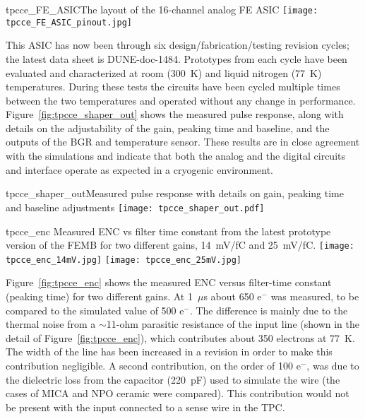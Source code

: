\begin{cdrfigure}{tpcce_FE_ASIC}{The layout of the 16-channel analog FE ASIC}
\texttt{[image: tpcce\_FE\_ASIC\_pinout.jpg]}
\end{cdrfigure}

This ASIC has now been through six design/fabrication/testing revision cycles; the latest data sheet is DUNE-doc-1484.
Prototypes from each cycle have been evaluated and characterized at room (300~K) and liquid nitrogen (77~K) temperatures.
During these tests the circuits have been cycled multiple times
between the two temperatures and operated without any change in performance.
Figure~\ref{fig:tpcce_shaper_out} shows the measured pulse response, along with
details on the adjustability of the gain, peaking time and baseline,
and the outputs of the BGR and temperature sensor.
These results are in close agreement with the simulations and indicate
that both the analog and the digital circuits and interface operate as
expected in a cryogenic environment.

\begin{cdrfigure}{tpcce_shaper_out}{Measured pulse response with details on gain, peaking time and baseline adjustments}
\texttt{[image: tpcce\_shaper\_out.pdf]}
\end{cdrfigure}

\begin{cdrfigure}{tpcce_enc}{
Measured ENC vs filter time constant from the latest prototype version of the FEMB
for two different gains, 14~mV/fC and 25~mV/fC.}
\texttt{[image: tpcce\_enc\_14mV.jpg]}
\texttt{[image: tpcce\_enc\_25mV.jpg]}
\end{cdrfigure}


Figure~\ref{fig:tpcce_enc} shows the measured ENC versus filter-time constant (peaking time) for two different gains.
At 1~$\mu$s about 650 e$^{-}$ was measured, to be compared to the simulated value of 500 e$^{-}$.
The difference is mainly due to the thermal noise from a $\sim$11-ohm parasitic resistance of the input
line (shown in the detail of Figure~\ref{fig:tpcce_enc}), which contributes about 350 electrons at 77~K.
The width of the line has been increased in a revision in order to make this contribution negligible.
A second contribution, on the order of 100 e$^{-}$,
was due to the dielectric loss from the capacitor (220~pF) used to simulate the wire
(the cases of MICA and NPO ceramic were compared).
This contribution would not be present with the input connected to a sense wire in the TPC.

